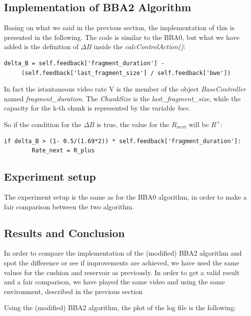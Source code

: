 \documentclass[a4paper]{report}
\begin{document}
\subsection{Implementation of BBA2 Algorithm}

Basing on what we said in the previous section, the implementation of this is presented in the following. 
The code is similar to the BBA0, but what we have added is the definition of $\Delta B$  inside the \textit{calcControlAction()}:

\begin{Verbatim}
delta_B = self.feedback['fragment_duration'] -
	 (self.feedback['last_fragment_size'] / self.feedback['bwe'])
\end{Verbatim}

In fact the istantaneous video rate V is the member of the object \textit{BaseController} named \textit{fragment\_duration}. The \textit{ChunkSize} is the \textit{last\_fragment\_size}, while the capacity for the k-th chunk is represented by the variable \textit{bwe}.

So if the condition for the $\Delta B$ is true, the value for the $R_{next}$ will be $R^+$:

\begin{Verbatim}
if delta_B > (1- 0.5/(1.69*2)) * self.feedback['fragment_duration']:
	    Rate_next = R_plus
\end{Verbatim}

\subsection{Experiment setup}

The experiment setup is the same as for the BBA0 algorithm, in order to make a fair comparison between the two algorithm.

\subsection{Results and Conclusion}

In order to compare the implementation of the (modified) BBA2 algorithm and spot the difference or see if improvements are achieved, we have used the same values for the cushion and reservoir as previously.
In order to get a valid result and a fair comparison, we have played the same video and using the same environment, described in the previous section

Using the (modified) BBA2 algorithm, the plot of the log file is the following:
\end{document}
